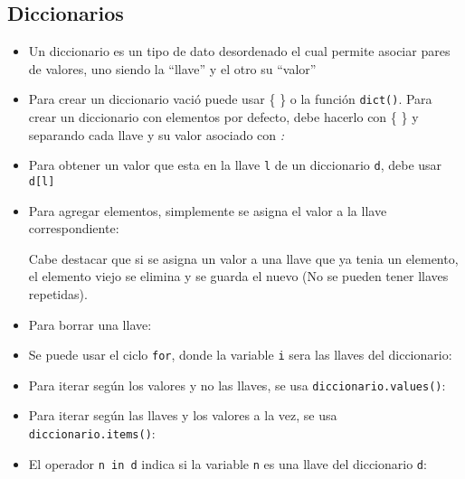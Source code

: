 \subsection*{Diccionarios}

\begin{itemize}
    \item Un diccionario es un tipo de dato desordenado el cual permite asociar pares de valores, uno siendo la ``llave'' y el otro su ``valor''
    
    \item Para crear un diccionario vació puede usar \{ \} o la función \texttt{dict()}. Para crear un diccionario con elementos por defecto, debe hacerlo con \{ \} y separando cada llave y su valor asociado con \textit{:}

    \item Para obtener un valor que esta en la llave \texttt{l} de un diccionario \texttt{d}, debe usar \texttt{d[l]}

    \item Para agregar elementos, simplemente se asigna el valor a la llave correspondiente:

    Cabe destacar que si se asigna un valor a una llave que ya tenia un elemento, el elemento viejo se elimina y se guarda el nuevo (No se pueden tener llaves repetidas).

    \item Para borrar una llave:

    \item Se puede usar el ciclo \texttt{for}, donde la variable \texttt{i} sera las llaves del diccionario:

    \item Para iterar según los valores y no las llaves, se usa \texttt{diccionario.values()}:

    \item Para iterar según las llaves y los valores a la vez, se usa \texttt{diccionario.items()}:

    \item El operador \texttt{n in d} indica si la variable \texttt{n} es una llave del diccionario \texttt{d}:
\end{itemize}
